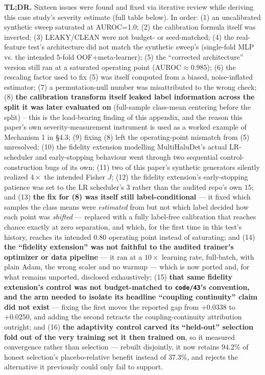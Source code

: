 \documentclass[10pt]{article} %
\begin{document}
\textbf{TL;DR.} Sixteen issues were found and fixed via iterative review while
deriving this case study's severity estimate (full table below). In
order: (1) an uncalibrated
synthetic sweep saturated at AUROC=1.0; (2) the calibration formula
itself was inverted; (3) LEAKY/CLEAN were not budget- or seed-matched;
(4) the real-feature test's architecture did not match the synthetic
sweep's (single-fold MLP vs. the intended 5-fold OOF+meta-learner);
(5) the ``corrected architecture'' version still ran at a saturated
operating point (AUROC$\approx0.985$); (6) the rescaling factor used to
fix (5) was itself computed from a biased, noise-inflated estimator;
(7) a permutation-null number was misattributed to the wrong check;
(8) \textbf{the calibration transform itself leaked label information across
the split it was later evaluated on} (full-sample class-mean centering
before the split) -- this is the load-bearing finding of this appendix,
and the reason this paper's own severity-measurement instrument is used
as a worked example of Mechanism 1 in §4.3; (9) fixing (8) left the
operating-point mismatch from (5) unresolved; (10) the fidelity extension
modelling MultiHaluDet's actual LR-scheduler and early-stopping behaviour
went through two sequential control-construction bugs of its own; (11)
two of this paper's synthetic generators silently realized $4\times$ the
intended Fisher $J$; (12) the fidelity extension's early-stopping
patience was set to the LR scheduler's $3$ rather than the audited
repo's own $15$; and (13) \textbf{the fix for (8) was itself still
label-conditional} --- it fixed which samples the class means were
\emph{estimated} from but not which label decided how each point was
\emph{shifted} --- replaced with a fully label-free calibration that
reaches chance exactly at zero separation, and which, for the first time
in this test's history, reaches its intended $0.80$ operating point
instead of saturating; and (14) \textbf{the ``fidelity extension'' was not
faithful to the audited trainer's optimizer or data pipeline} --- it ran at a
$10\times$ learning rate, full-batch, with plain Adam, the wrong scaler and no
warmup --- which is now ported and, for what remains unported, disclosed
exhaustively; (15) \textbf{that same fidelity extension's control was not
budget-matched to \texttt{code/43}'s convention, and the arm needed to isolate
its headline ``coupling continuity'' claim did not exist} --- fixing the first
moves the reported gap from $+0.0338$ to $+0.0250$, and adding the second
retracts the coupling-continuity attribution outright; and (16) \textbf{the
adaptivity control carved its ``held-out'' selection fold out of the very
training set it then trained on}, so it measured convergence rather than
selection --- rebuilt disjointly, it now retains $94.2\%$ of honest selection's
placebo-relative benefit instead of $37.3\%$, and rejects the alternative it
previously could only fail to support.
\end{document}
